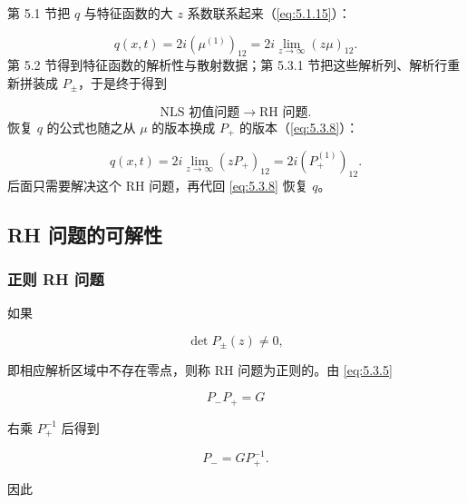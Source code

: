 \documentclass[
    lang=cn,
    scheme=chinese,
    mode=simple,
    device=normal,
    color=blue,
    math=cm,
    thmcnt=section,
    12pt,
    nowatermark
]{elegantbook}
\begin{document}


\begin{callout}[到这里发生了什么？]
    第 5.1 节把 $q$ 与特征函数的大 $z$ 系数联系起来（\eqref{eq:5.1.15}）：

    \[
        q(x,t)=2i(\mu^{(1)})_{12}=2i\lim\limits_{z\to\infty}(z\mu)_{12}.
    \]
    第 5.2 节得到特征函数的解析性与散射数据；第 5.3.1 节把这些解析列、解析行重新拼装成 $P_\pm$，于是终于得到

    \[
        \boxed{\text{NLS 初值问题}\longrightarrow\text{RH 问题}.}
    \]
    恢复 $q$ 的公式也随之从 $\mu$ 的版本换成 $P_+$ 的版本（\eqref{eq:5.3.8}）：

    \[
        q(x,t)=2i\lim\limits_{z\to\infty}(zP_+)_{12}=2i(P_+^{(1)})_{12}.
    \]
    后面只需要解决这个 RH 问题，再代回 \eqref{eq:5.3.8} 恢复 $q$。
    
\end{callout}

\subsection{RH 问题的可解性}

\subsubsection{正则 RH 问题}

如果

\begin{equation}
    \det P_\pm(z)\ne0,
    \tag{5.3.10}
    \label{eq:5.3.10}
\end{equation}

即相应解析区域中不存在零点，则称 RH 问题为正则的。由 \eqref{eq:5.3.5}

\[
    P_-P_+=G
\]

右乘 $P_+^{-1}$ 后得到

\[
    P_-=GP_+^{-1}.
\]

因此
\end{document}
